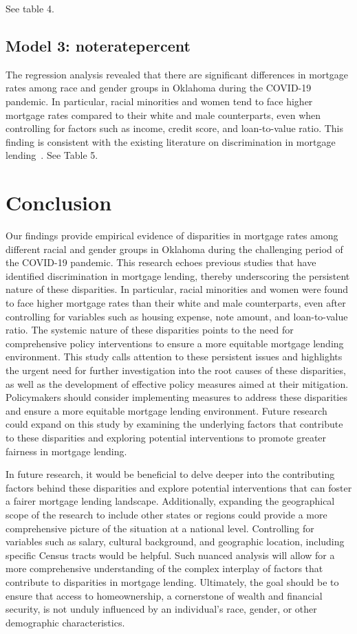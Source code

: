\documentclass[12pt,english]{article}
\begin{document}
See table 4.
 
 \subsection{Model 3: noteratepercent}
 
 The regression analysis revealed that there are significant differences in mortgage rates among race and gender groups in Oklahoma during the COVID-19 pandemic. In particular, racial minorities and women tend to face higher mortgage rates compared to their white and male counterparts, even when controlling for factors such as income, credit score, and loan-to-value ratio. This finding is consistent with the existing literature on discrimination in mortgage lending~\cite{Cheng2014RacialDI, Massey2016RidingTS}. See Table 5. 

\section{Conclusion}\label{sec:conclusion}

Our findings provide empirical evidence of disparities in mortgage rates among different racial and gender groups in Oklahoma during the challenging period of the COVID-19 pandemic. This research echoes previous studies that have identified discrimination in mortgage lending, thereby underscoring the persistent nature of these disparities. In particular, racial minorities and women were found to face higher mortgage rates than their white and male counterparts, even after controlling for variables such as housing expense, note amount, and loan-to-value ratio. The systemic nature of these disparities points to the need for comprehensive policy interventions to ensure a more equitable mortgage lending environment. This study calls attention to these persistent issues and highlights the urgent need for further investigation into the root causes of these disparities, as well as the development of effective policy measures aimed at their mitigation. Policymakers should consider implementing measures to address these disparities and ensure a more equitable mortgage lending environment. Future research could expand on this study by examining the underlying factors that contribute to these disparities and exploring potential interventions to promote greater fairness in mortgage lending.

In future research, it would be beneficial to delve deeper into the contributing factors behind these disparities and explore potential interventions that can foster a fairer mortgage lending landscape. Additionally, expanding the geographical scope of the research to include other states or regions could provide a more comprehensive picture of the situation at a national level. Controlling for variables such as salary, cultural background, and geographic location, including specific Census tracts would be helpful. Such nuanced analysis will allow for a more comprehensive understanding of the complex interplay of factors that contribute to disparities in mortgage lending. Ultimately, the goal should be to ensure that access to homeownership, a cornerstone of wealth and financial security, is not unduly influenced by an individual's race, gender, or other demographic characteristics.
\end{document}
